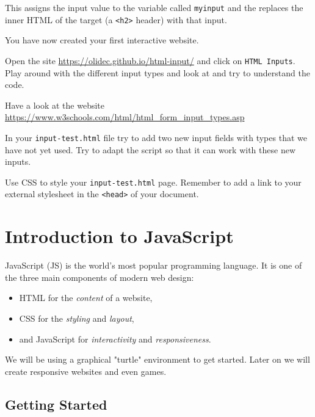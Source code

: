 \documentclass[english,11pt,a4paper]{report}
\begin{document}
This assigns the input value to the variable called \verb|myinput| and the replaces the inner HTML of the target (a \verb|<h2>| header) with that input.

You have now created your first interactive website.

\begin{ex}
Open the site \url{https://olidec.github.io/html-input/} and click on \verb|HTML Inputs|. Play around with the different input types and look at  and try to understand the code. 
\end{ex}

\begin{ex}
Have a look at the website \url{https://www.w3schools.com/html/html_form_input_types.asp}

In your \verb|input-test.html| file try to add two new input fields with types that we have not yet used. Try to adapt the script so that it can work with these new inputs.
\end{ex}

\begin{ex}
Use CSS to style your \verb|input-test.html| page. Remember to add a link to your external stylesheet in the \verb|<head>| of your document.
\end{ex}


\newpage

\section{Introduction to JavaScript}

JavaScript (JS) is the world's most popular programming language. It is one of the three main components of modern web design:
\begin{itemize}
\item HTML for the \emph{content} of a website,
\item CSS for the \emph{styling} and \emph{layout},
\item and JavaScript for \emph{interactivity} and \emph{responsiveness}.
\end{itemize}

We will be using a graphical "turtle" environment to get started. Later on we will create responsive websites and even games.

\subsection{Getting Started}
\end{document}
